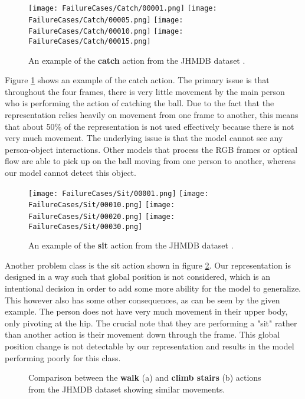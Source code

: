 \begin{figure}[ht]
	\texttt{[image: FailureCases/Catch/00001.png]}
	\texttt{[image: FailureCases/Catch/00005.png]}
	\texttt{[image: FailureCases/Catch/00010.png]}
	\texttt{[image: FailureCases/Catch/00015.png]}
	\centering
	\caption{An example of the \textbf{catch} action from the JHMDB dataset \cite{JHMDB}.}
	\label{fig:catch-action}
\end{figure}

Figure \ref{fig:catch-action} shows an example of the catch action. The primary issue is that throughout the four frames, there is very little movement by the main person who is performing the action of catching the ball. Due to the fact that the representation relies heavily on movement from one frame to another, this means that about 50\% of the representation is not used effectively because there is not very much movement. The underlying issue is that the model cannot see any person-object interactions. Other models that process the RGB frames or optical flow are able to pick up on the ball moving from one person to another, whereas our model cannot detect this object.

\begin{figure}[ht]
	\texttt{[image: FailureCases/Sit/00001.png]}
	\texttt{[image: FailureCases/Sit/00010.png]}
	\texttt{[image: FailureCases/Sit/00020.png]}
	\texttt{[image: FailureCases/Sit/00030.png]}
	\centering
	\caption{An example of the \textbf{sit} action from the JHMDB dataset \cite{JHMDB}.}
	\label{fig:sit-action}
\end{figure}

Another problem class is the sit action shown in figure \ref{fig:sit-action}. Our representation is designed in a way such that global position is not considered, which is an intentional decision in order to add some more ability for the model to generalize. This however also has some other consequences, as can be seen by the given example. The person does not have very much movement in their upper body, only pivoting at the hip. The crucial note that they are performing a "sit" rather than another action is their movement down through the frame. This global position change is not detectable by our representation and results in the model performing poorly for this class.

\begin{figure}[ht]
	\centering
	\caption{Comparison between the \textbf{walk} (a) and \textbf{climb stairs} (b) actions from the JHMDB dataset \cite{JHMDB} showing similar movements.}
	\label{fig:walk-climb-actions}
\end{figure}

